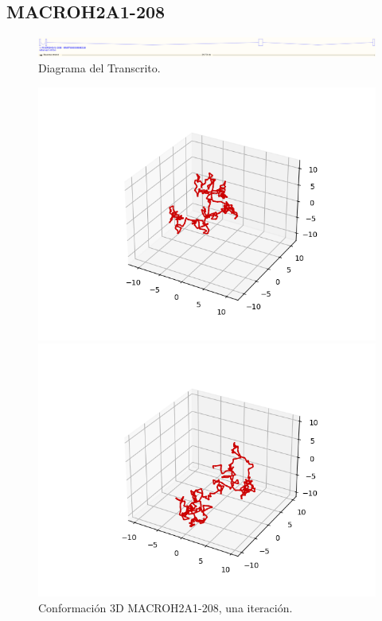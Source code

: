 \documentclass[a4paper,11pt,titlepage]{article}
\theoremstyle{definition}
\begin{document}
\newpage
\subsection*{MACROH2A1-208}\label{subsec:gene4}

\begin{figure}[H]
    \centering
    \includegraphics[width=\textwidth]{images/MACROH2A1-208.png}
    \caption{Diagrama del Transcrito.}
    \label{fig:MACROH2A1-208-diag}
\end{figure}

\begin{figure}[H]
    \centering
    \begin{minipage}[c]{0.31\textwidth}
        \centering
        \includegraphics[width=\textwidth]{images/MACROH2A1-208-db_one.png}
        \caption{Conformación 3D MACROH2A1-208, una iteración.}
        \label{fig:MACROH2A1-208-one}
    \end{minipage}
    \hfill
    \begin{minipage}[c]{0.31\textwidth}
        \centering
        \includegraphics[width=\textwidth]{images/MACROH2A1-208-db_iter.png}

\end{minipage}
\end{figure}
\end{document}
